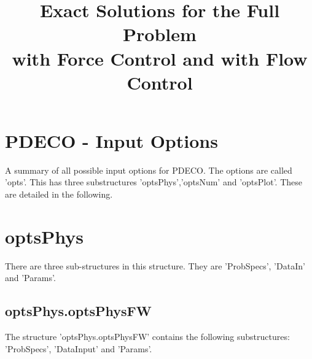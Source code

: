 \documentclass[11pt, a4paper]{article}
\title{Exact Solutions for the Full Problem \\with Force Control and with Flow Control}
\date{}
\theoremstyle{definition}
\begin{document}
	
\section*{PDECO - Input Options}
A summary of all possible input options for PDECO. The options are called 'opts'. This has three substructures 'optsPhys','optsNum' and 'optsPlot'. These are detailed in the following.

\section{optsPhys}	
There are three sub-structures in this structure. They are 'ProbSpecs', 'DataIn' and 'Params'.
\subsection{optsPhys.optsPhysFW}
The structure 'optsPhys.optsPhysFW' contains the following substructures: 'ProbSpecs', 'DataInput' and 'Params'.
\end{document}

